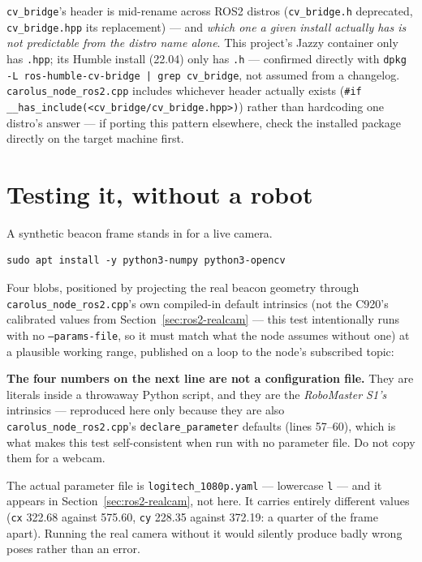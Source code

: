 \documentclass[11pt]{report}
\newenvironment{warningbox}%
  {\begin{lrbox}{\warnbox}\begin{minipage}{0.90\textwidth}}%
  {\end{minipage}\end{lrbox}%
   \begin{center}\fcolorbox{black}{codebg}{\usebox{\warnbox}}\end{center}}
\begin{document}
\begin{warningbox}
\texttt{cv\_bridge}'s header is mid-rename across ROS2 distros
(\texttt{cv\_bridge.h} deprecated, \texttt{cv\_bridge.hpp} its replacement)
--- and \emph{which one a given install actually has is not predictable
from the distro name alone}. This project's Jazzy container only has
\texttt{.hpp}; its Humble install (22.04) only has \texttt{.h} --- confirmed
directly with \texttt{dpkg -L ros-humble-cv-bridge | grep cv\_bridge}, not
assumed from a changelog. \texttt{carolus\_node\_ros2.cpp} includes
whichever header actually exists (\texttt{\#if
\_\_has\_include(<cv\_bridge/cv\_bridge.hpp>)}) rather than hardcoding one
distro's answer --- if porting this pattern elsewhere, check the installed
package directly on the target machine first.
\end{warningbox}

\section{Testing it, without a robot}
\label{sec:ros2-synthetic}

A synthetic beacon frame stands in for a live camera.

\begin{lstlisting}[style=shell]
sudo apt install -y python3-numpy python3-opencv
\end{lstlisting}

Four blobs, positioned by projecting the real beacon geometry through
\texttt{carolus\_node\_ros2.cpp}'s own compiled-in default intrinsics (not
the C920's calibrated values from Section~\ref{sec:ros2-realcam} --- this
test intentionally runs with no \texttt{--params-file}, so it must match
what the node assumes without one) at a plausible working range, published
on a loop to the node's subscribed topic:

\begin{warningbox}
\textbf{The four numbers on the next line are not a configuration file.}
They are literals inside a throwaway Python script, and they are the
\emph{RoboMaster S1's} intrinsics --- reproduced here only because they are
also \texttt{carolus\_node\_ros2.cpp}'s \texttt{declare\_parameter} defaults
(lines 57--60), which is what makes this test self-consistent when run with
no parameter file. Do not copy them for a webcam.

The actual parameter file is \texttt{logitech\_1080p.yaml} --- lowercase
\texttt{l} --- and it appears in Section~\ref{sec:ros2-realcam}, not here.
It carries entirely different values (\texttt{cx} 322.68 against 575.60,
\texttt{cy} 228.35 against 372.19: a quarter of the frame apart). Running
the real camera without it would silently produce badly wrong poses rather
than an error.
\end{warningbox}
\end{document}
